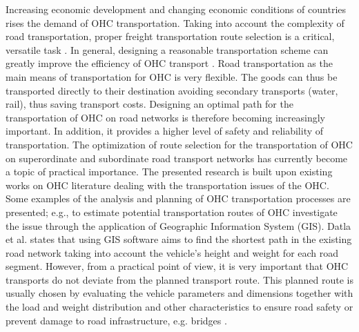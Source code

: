 %

Increasing economic development and changing economic conditions of countries rises the demand of OHC transportation. Taking into account the complexity of road transportation, proper freight transportation route selection is a critical, versatile task \cite{bazaras2013optimal, xu2001methodology, sivilevicius2007dynamics}. In general, designing a reasonable transportation scheme can greatly improve the efficiency of OHC transport \cite{meng2015optimized}. Road transportation as the main means of transportation for OHC is very flexible. The goods can thus be transported directly to their destination avoiding secondary transports (water, rail), thus saving transport costs. Designing an optimal path for the transportation of OHC on road networks is therefore becoming increasingly important. In addition, it provides a higher level of safety and reliability of transportation. The optimization of route selection for the transportation of OHC on superordinate and subordinate road transport networks has currently become a topic of practical importance\cite{geisberger2011efficient}. 
The presented research is built upon existing works on OHC literature dealing with the transportation issues of the OHC. Some examples of the analysis and planning of OHC transportation processes are presented; e.g., to estimate potential transportation routes of OHC \cite{durham2002gis} investigate the issue through the application of Geographic Information System (GIS). Datla et al. \cite{datla2004gis} states that using GIS software aims to find the shortest path in the existing road network taking into account the vehicle’s height and weight for each road segment. However, from a practical point of view, it is very important that OHC transports do not deviate from the planned transport route. This planned route is usually chosen by evaluating the vehicle parameters and dimensions together with the load and weight distribution and other characteristics to ensure road safety or prevent damage to road infrastructure, e.g. bridges \cite{ecmt2006improving, vaitkus2016effect, kombe2017modelling, pauer2017development}.


